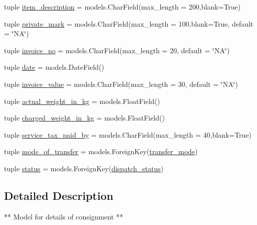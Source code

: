 \begin{DoxyCompactItemize}
tuple \hyperlink{classBuiltyMaker_1_1main_1_1models_1_1consignment__details_a0a91fb729501749bb4346369615d69a0}{item\-\_\-description} = models.\-Char\-Field(max\-\_\-length = 200,blank=\-True)
\item 
tuple \hyperlink{classBuiltyMaker_1_1main_1_1models_1_1consignment__details_a6dc58708b951d054a7bb2641e59dd4f3}{private\-\_\-mark} = models.\-Char\-Field(max\-\_\-length = 100,blank=\-True, default = \char`\"{}\-N\-A\char`\"{})
\item 
tuple \hyperlink{classBuiltyMaker_1_1main_1_1models_1_1consignment__details_aa3e819402fd8d98cb6b6803ce4c2fa75}{invoice\-\_\-no} = models.\-Char\-Field(max\-\_\-length = 20, default = \char`\"{}\-N\-A\char`\"{})
\item 
tuple \hyperlink{classBuiltyMaker_1_1main_1_1models_1_1consignment__details_a49683e5a98ebcbfb52f5c8b09b033076}{date} = models.\-Date\-Field()
\item 
tuple \hyperlink{classBuiltyMaker_1_1main_1_1models_1_1consignment__details_a4c34f0cabea2f6020919637c53d340be}{invoice\-\_\-value} = models.\-Char\-Field(max\-\_\-length = 30, default = \char`\"{}\-N\-A\char`\"{})
\item 
tuple \hyperlink{classBuiltyMaker_1_1main_1_1models_1_1consignment__details_aaa99df3a22fe6a22684f5e135aba25e5}{actual\-\_\-weight\-\_\-in\-\_\-kg} = models.\-Float\-Field()
\item 
tuple \hyperlink{classBuiltyMaker_1_1main_1_1models_1_1consignment__details_afafd9ef2fa60a8619f1d20d0395d3735}{charged\-\_\-weight\-\_\-in\-\_\-kg} = models.\-Float\-Field()
\item 
tuple \hyperlink{classBuiltyMaker_1_1main_1_1models_1_1consignment__details_afe8f2f7e5eea040ed543b42bb9c58d3b}{service\-\_\-tax\-\_\-paid\-\_\-by} = models.\-Char\-Field(max\-\_\-length = 40,blank=\-True)
\item 
tuple \hyperlink{classBuiltyMaker_1_1main_1_1models_1_1consignment__details_a011dc16c7d9620e67d1f2cd4fae63016}{mode\-\_\-of\-\_\-transfer} = models.\-Foreign\-Key(\hyperlink{classBuiltyMaker_1_1main_1_1models_1_1transfer__mode}{transfer\-\_\-mode})
\item 
tuple \hyperlink{classBuiltyMaker_1_1main_1_1models_1_1consignment__details_a98af015be664e6ee397ac2dcf44cee37}{status} = models.\-Foreign\-Key(\hyperlink{classBuiltyMaker_1_1main_1_1models_1_1dispatch__status}{dispatch\-\_\-status})
\end{DoxyCompactItemize}


\subsection{\-Detailed \-Description}
\begin{DoxyVerb}
    ** Model for details of consignment **
\end{DoxyVerb}
 

